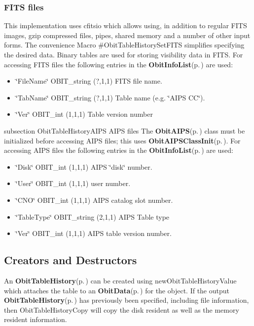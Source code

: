 \subsubsection{FITS files}\label{ObitTableWX_8h_TableFITS}
This implementation uses cfitsio which allows using, in addition to regular FITS images, gzip compressed files, pipes, shared memory and a number of other input forms. The convenience Macro \#Obit\-Table\-History\-Set\-FITS simplifies specifying the desired data. Binary tables are used for storing visibility data in FITS. For accessing FITS files the following entries in the {\bf Obit\-Info\-List}{\rm (p.\,\pageref{structObitInfoList})} are used: \begin{itemize}
\item \char`\"{}File\-Name\char`\"{} OBIT\_\-string (?,1,1) FITS file name. \item \char`\"{}Tab\-Name\char`\"{} OBIT\_\-string (?,1,1) Table name (e.g. \char`\"{}AIPS CC\char`\"{}). \item \char`\"{}Ver\char`\"{} OBIT\_\-int (1,1,1) Table version number\end{itemize}
subsection Obit\-Table\-History\-AIPS AIPS files The {\bf Obit\-AIPS}{\rm (p.\,\pageref{structObitAIPS})} class must be initialized before accessing AIPS files; this uses {\bf Obit\-AIPSClass\-Init}{\rm (p.\,\pageref{ObitAIPS_8c_a5})}. For accessing AIPS files the following entries in the {\bf Obit\-Info\-List}{\rm (p.\,\pageref{structObitInfoList})} are used: \begin{itemize}
\item \char`\"{}Disk\char`\"{} OBIT\_\-int (1,1,1) AIPS \char`\"{}disk\char`\"{} number. \item \char`\"{}User\char`\"{} OBIT\_\-int (1,1,1) user number. \item \char`\"{}CNO\char`\"{} OBIT\_\-int (1,1,1) AIPS catalog slot number. \item \char`\"{}Table\-Type\char`\"{} OBIT\_\-string (2,1,1) AIPS Table type \item \char`\"{}Ver\char`\"{} OBIT\_\-int (1,1,1) AIPS table version number.\end{itemize}
\subsection{Creators and Destructors}\label{ObitTableHistory_8h_ObitTableHistoryaccess}
An {\bf Obit\-Table\-History}{\rm (p.\,\pageref{structObitTableHistory})} can be created using new\-Obit\-Table\-History\-Value which attaches the table to an {\bf Obit\-Data}{\rm (p.\,\pageref{structObitData})} for the object. If the output {\bf Obit\-Table\-History}{\rm (p.\,\pageref{structObitTableHistory})} has previously been specified, including file information, then Obit\-Table\-History\-Copy will copy the disk resident as well as the memory resident information.

